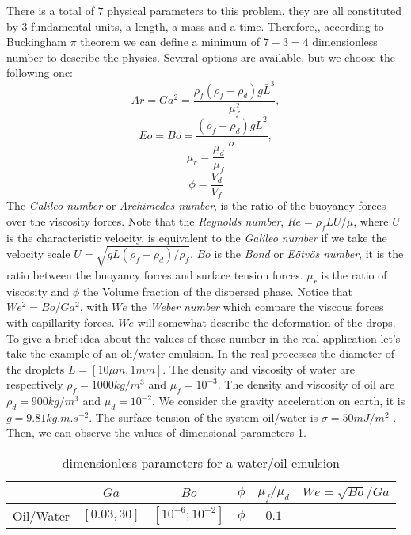There is a total of $7$ physical parameters to this problem, they are all constituted by 3 fundamental units, a length, a mass and a time.
Therefore,, according to Buckingham $\pi$ theorem we can define a minimum of $7-3 = 4$ dimensionless number to describe the physics. 
Several options are available, but we choose the following one: 
\begin{equation*}
    Ar = Ga^2 =\frac{\rho_f(\rho_f - \rho_d) g \bar{L}^3}{\mu^2_f},
\end{equation*}
\begin{equation*}
    Eo = Bo =\frac{(\rho_f - \rho_d) g \bar{L}^2}{\sigma},
\end{equation*}
\begin{equation*}
    \mu_r = \frac{\mu_d}{\mu_f}
\end{equation*}
\begin{equation*}
    \phi = \frac{V_d}{V_f}
\end{equation*}
The \textit{Galileo number} or \textit{Archimedes number}, is the ratio of the buoyancy forces over the viscosity forces.
Note that the \textit{Reynolds number}, $Re = \rho_f L U/\mu$, where $U$ is the characteristic velocity, is equivalent to the \textit{Galileo number} if we take the velocity scale $U = \sqrt{gL(\rho_f-\rho_d)/\rho_f}$.
$Bo$ is the \textit{Bond} or \textit{Eötvös number}, it is the ratio between the buoyancy forces and surface tension forces. 
$\mu_r$ is the ratio of viscosity and $\phi$ the Volume fraction of the dispersed phase.
Notice that $We^2 = Bo/Ga^2$, with $We$ the \textit{Weber number} which compare the viscous forces with capillarity forces.
$We$ will somewhat describe the deformation of the drops. 
To give a brief idea about the values of those number in the real application let's take the example of an oli/water emulsion.
In the real processes the diameter of the droplets $L = [10 \mu m, 1 mm]$.
The density and viscosity of water are respectively $\rho_f = 1000 kg/m^3$ and $\mu_f = 10^{-3}$.
The density and viscosity of oil are $\rho_d = 900 kg/m^3$ and $\mu_d = 10^{-2}$.
We consider the gravity acceleration on earth, it is $g= 9.81 kg.m.s^{-2}$.
The surface tension of the system oil/water is $\sigma = 50 mJ/m^2$ \citep{de2015gouttes}. 
Then, we can observe the values of dimensional parameters \ref{tab:parameters}.
\begin{table}[h!]
    \centering
    \begin{tabular}{|c||c|c|c|c||||c|}
        \hline&$Ga$&$Bo$&$\phi$&$\mu_f/\mu_d$&$We=\sqrt{Bo}/Ga$\\ \hline
        \hline Oil/Water&$[0.03,30]$&$[10^{-6};10^{-2}]$&$\phi$&$0.1$&$ $\\ \hline
    \end{tabular}
    \caption{dimensionless parameters for a water/oil emulsion}
    \label{tab:parameters}
\end{table}



